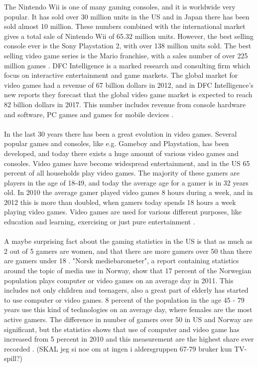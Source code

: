 The Nintendo Wii is one of many gaming consoles, and it is worldwide very popular. It has sold over 30 million units in the US and in Japan there has been sold almost 10 million. These numbers combined with the international market gives a total sale of Nintendo Wii of 65.32 million units. However, the best selling console ever is the Sony Playstation 2, with over 138 million units sold. The best selling video game series is the Mario franchise, with a sales number of over 225 million games \cite{statistics2012}. DFC Intelligence is a marked research and consulting firm which focus on interactive entertainment and game markets. The global market for video games had a revenue of 67 billion dollars in 2012, and in DFC Intelligence's new reports they forecast that the global video game market is expected to reach 82 billion dollars in 2017. This number includes revenue from console hardware and software, PC games and games for mobile devices \cite{videogameforcast} \cite{aboutdfcint}. \\ \\
In the last 30 years there has been a great evolution in video games. Several popular games and consoles, like e.g. Gameboy and Playstation, has been developed, and today there exists a huge amount of various video games and consoles. Video games have become widespread entertainment, and in the US 65 percent of all households play video games. The majority of these gamers are players in the age of 18-49, and today the average age for a gamer is in 32 years old. In 2010 the average gamer played video games 8 hours during a week, and in 2012 this is more than doubled, when gamers today spends 18 hours a week playing video games.  Video games are used for various different purposes, like education and learning, exercising or just pure entertainment \cite{statistics2010} \cite{statistics2012}. \\ \\
A maybe surprising fact about the gaming statistics in the US is that as much as 2 out of 5 gamers are women, and that there are more gamers over 50 than there are gamers under 18 \cite{statistics2012}. "Norsk mediebarometer", a report containing statistics around the topic of media use in Norway, show that 17 percent of the Norwegian population plays computer or video games on an average day in 2011. This includes not only children and teenagers, also a great part of elderly has started to use computer or video games. 8 percent of the population in the age 45 - 79 years use this kind of technologies on an average day, where females are the most active gamers. The difference in number of gamers over 50 in US and Norway are significant, but the statistics shows that use of computer and video game has increased from 5 percent in 2010 and this measurement are the highest share ever recorded \cite{ssb2010} \cite{ssb2011}. (SKAL jeg si noe om at ingen i aldersgruppen 67-79 bruker kun TV-spill?) 
